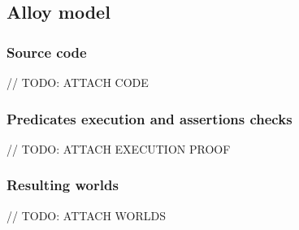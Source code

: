 \documentclass[../../main.tex]{subfiles}
\begin{document}
\subsection{Alloy model}

\subsubsection{Source code}

// TODO: ATTACH CODE

\subsubsection{Predicates execution and assertions checks}

// TODO: ATTACH EXECUTION PROOF

\subsubsection{Resulting worlds}

// TODO: ATTACH WORLDS
\end{document}
